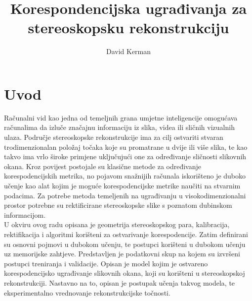 \documentclass[times, utf8, zavrsni]{fer}
\begin{document}

\title{Korespondencijska ugrađivanja za stereoskopsku rekonstrukciju}

\author{David Kerman}

\maketitle




\tableofcontents

\chapter{Uvod}
Računalni vid kao jedna od temeljnih grana umjetne inteligencije omogućava računalima da izluče značajnu informaciju iz slika, videa ili sličnih vizualnih ulaza. Područje stereoskopske rekonstrukcije ima za cilj ostvariti stvaran trodimenzionalan položaj točaka koje su promatrane u dvije ili više slika, te kao takvo ima vrlo široke primjene uključujući one za određivanje sličnosti slikovnih okana. Kroz povijest postojale su klasične metode za određivanje korespodencijskih metrika, no pojavom snažnijih računala iskorišteno je duboko učenje kao alat kojim je moguće korespodencijske metrike naučiti na stvarnim podacima. Za potrebe metoda temeljenih na ugrađivanju u visokodimenzionalni prostor potrebne su rektificirane stereoskopske slike s poznatom dubinskom informacijom.\\

U okviru ovog radu opisana je geometrija stereoskopskog para, kalibracija, rektifikacija i algoritmi korišteni za ostvarivanje korespodencije. Zatim definirani su osnovni pojmovi u dubokom učenju, te postupci korišteni u dubokom učenju uz memorijske zahtjeve. Predstavljen je podatkovni skup na kojem su izvršeni postupci treniranja i validacije. Opisan je model kojim je ostvareno korespodencijsko ugrađivanje slikovnih okana, koji su korišteni u stereoskopskoj rekonstrukciji. Nastavno na to, opisan je postupak učenja takvog modela, te eksperimentalno vrednovanje rekonstrukcijske točnosti.
\end{document}
